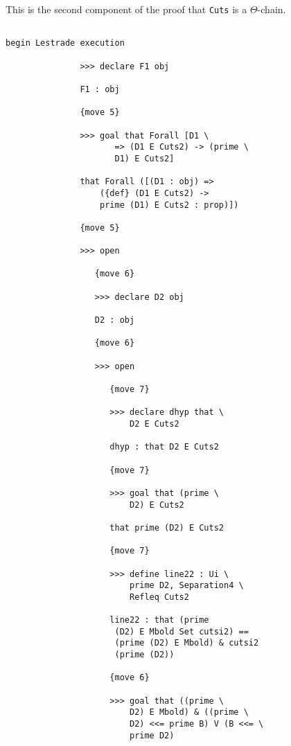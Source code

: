 \documentclass[12pt]{article}
\begin{document}
This is the second component of the proof that {\tt Cuts} is a $\Theta$-chain.

\begin{verbatim}

begin Lestrade execution

               >>> declare F1 obj

               F1 : obj

               {move 5}

               >>> goal that Forall [D1 \
                      => (D1 E Cuts2) -> (prime \
                      D1) E Cuts2]

               that Forall ([(D1 : obj) => 
                   ({def} (D1 E Cuts2) -> 
                   prime (D1) E Cuts2 : prop)])

               {move 5}

               >>> open

                  {move 6}

                  >>> declare D2 obj

                  D2 : obj

                  {move 6}

                  >>> open

                     {move 7}

                     >>> declare dhyp that \
                         D2 E Cuts2

                     dhyp : that D2 E Cuts2

                     {move 7}

                     >>> goal that (prime \
                         D2) E Cuts2

                     that prime (D2) E Cuts2

                     {move 7}

                     >>> define line22 : Ui \
                         prime D2, Separation4 \
                         Refleq Cuts2

                     line22 : that (prime 
                      (D2) E Mbold Set cutsi2) == 
                      (prime (D2) E Mbold) & cutsi2 
                      (prime (D2))

                     {move 6}

                     >>> goal that ((prime \
                         D2) E Mbold) & ((prime \
                         D2) <<= prime B) V (B <<= \
                         prime D2)


\end{verbatim}
\end{document}
